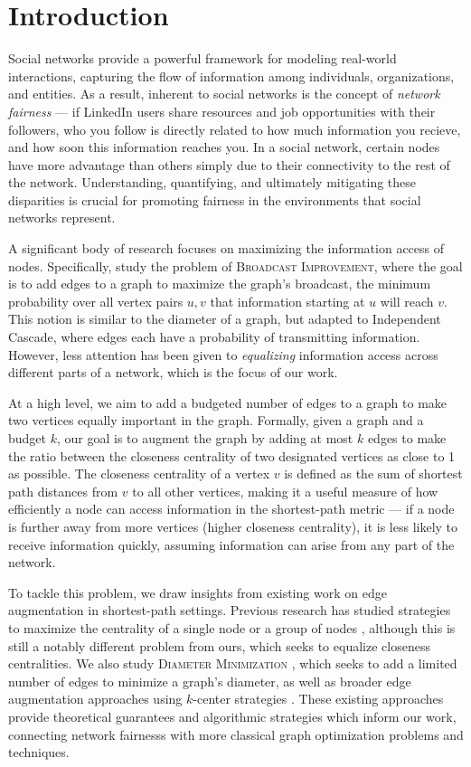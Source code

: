 \section{Introduction}
Social networks provide a powerful framework for modeling real-world interactions, capturing the flow of information among individuals, organizations, and entities. As a result, inherent to social networks is the concept of \textit{network fairness} \cite{boyd,bashardoust, fish} --- if LinkedIn users share resources and job opportunities with their followers, who you follow is directly related to how much information you recieve, and how soon this information reaches you. In a social network, certain nodes have more advantage than others simply due to their connectivity to the rest of the network. Understanding, quantifying, and ultimately mitigating these disparities is crucial for promoting fairness in the environments that social networks represent.

A significant body of research focuses on maximizing the information access of nodes. Specifically, \cite{bashardoust,bhaskara} study the problem of \textsc{Broadcast Improvement}, where the goal is to add edges to a graph to maximize the graph's broadcast, the minimum probability over all vertex pairs $u,v$ that information starting at $u$ will reach $v$. This notion is similar to the diameter of a graph, but adapted to Independent Cascade, where edges each have a probability of transmitting information. However, less attention has been given to \textit{equalizing} information access across different parts of a network, which is the focus of our work.

At a high level, we aim to add a budgeted number of edges to a graph to make two vertices equally important in the graph. Formally, given a graph and a budget $k$, our goal is to augment the graph by adding at most $k$ edges to make the ratio between the closeness centrality of two designated vertices as close to 1 as possible. The closeness centrality of a vertex $v$ is defined as the sum of shortest path distances from $v$ to all other vertices, making it a useful measure of how efficiently a node can access information in the shortest-path metric --- if a node is further away from more vertices (higher closeness centrality), it is less likely to receive information quickly, assuming information can arise from any part of the network.

To tackle this problem, we draw insights from existing work on edge augmentation in shortest-path settings. Previous research has studied strategies to maximize the centrality of a single node or a group of nodes \cite{crescenzi,medya}, although this is still a notably different problem from ours, which seeks to equalize closeness centralities. We also study \textsc{Diameter Minimization} \cite{adriaens,bilo,demaine,li}, which seeks to add a limited number of edges to minimize a graph’s diameter, as well as broader edge augmentation approaches using $k$-center strategies \cite{meyerson}. These existing approaches provide theoretical guarantees and algorithmic strategies which inform our work, connecting network fairnesss with more classical graph optimization problems and techniques.

